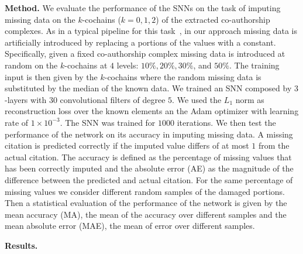 \textbf{Method.} We evaluate the performance of the SNNs on the task of imputing missing data on the $k$-cochains ($k=0,1,2$) of the extracted co-authorship complexes. As in a typical pipeline for this task~\cite{nelwamondo2007missing}, in our approach missing data is artificially introduced by replacing a portions of the values with a constant. Specifically, given a fixed co-authorship complex missing data is introduced at random on the $k$-cochains at $4$ levels: $10\%,  20\%,  30\%$, and $50\% $. The training input is then given by the $k$-cochains where the random missing data is substituted by the median of the known data. We trained an SNN composed by $3$-layers with $30$ convolutional filters of degree $5$. We used the $L_1$ norm as reconstruction loss over the known elements an the Adam optimizer with learning rate of $1\times 10^{-3}$. The SNN was trained for $1000$ iterations. We then test the performance of the network on its accuracy in imputing missing data. A missing citation is predicted correctly if the imputed value differs of at most $1$ from the actual citation. The accuracy is defined as the percentage of missing values that has been correctly imputed and the absolute error (AE) as the magnitude of the difference between the predicted and actual citation. For the same percentage of missing values we consider different random samples of the damaged portions. Then a statistical evaluation of the performance of the network is given by the mean accuracy (MA), the mean of the accuracy over different samples and the mean absolute error (MAE), the mean of error over different samples.

\textbf{Results.} 

